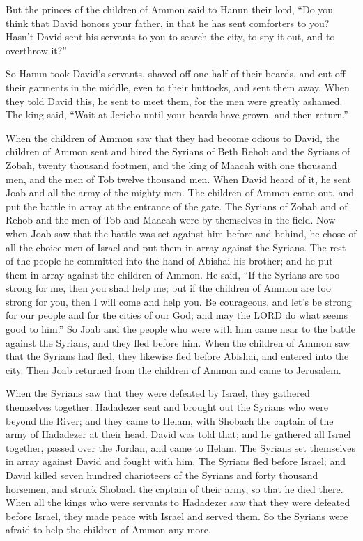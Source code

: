 \myverse{}But the princes of the children of Ammon said to Hanun their lord,
“Do you think that David honors your father, in that he has sent comforters to you? Hasn’t David sent
his servants to you to search the city, to spy it out, and to overthrow it?”

\myverse{}So Hanun took David’s servants, shaved off one half of their beards,
and cut off their garments in the middle, even to their buttocks, and sent them away.
\myverse{}When they told David this, he sent to meet them, for the men were greatly ashamed.
The king said, “Wait at Jericho until your beards have grown, and then return.”

\myverse{}When the children of Ammon saw that they had become odious to
David, the children of Ammon sent and hired the Syrians of Beth Rehob and the Syrians of Zobah, twenty
thousand footmen, and the king of Maacah with one thousand men, and the men of Tob twelve thousand men.
\myverse{}When David heard of it, he sent Joab and all the army of the mighty men.
\myverse{}The children of Ammon came out, and put the battle in array at the entrance
of the gate. The Syrians of Zobah and of Rehob and the men of Tob and Maacah were by themselves in the
field.
\myverse{}Now when Joab saw that the battle was set against him before and behind, he
chose of all the choice men of Israel and put them in array against the Syrians.
\myverse{}The rest of the people he committed into the hand of Abishai his brother;
and he put them in array against the children of Ammon.
\myverse{}He said, “If the Syrians are too strong for me, then you shall help me; but
if the children of Ammon are too strong for you, then I will come and help you.
\myverse{}Be courageous, and let’s be strong for our people and for the cities of our
God; and may the LORD do what seems good to him.”
\myverse{}So Joab and the people who were with him came near to the battle against
the Syrians, and they fled before him.
\myverse{}When the children of Ammon saw that the Syrians had fled, they likewise fled
before Abishai, and entered into the city. Then Joab returned from the children of Ammon and came to Jerusalem.

\myverse{}When the Syrians saw that they were defeated by Israel, they
gathered themselves together.
\myverse{}Hadadezer sent and brought out the Syrians who were beyond the River; and
they came to Helam, with Shobach the captain of the army of Hadadezer at their head.
\myverse{}David was told that; and he gathered all Israel together, passed over the
Jordan, and came to Helam. The Syrians set themselves in array against David and fought with him.
\myverse{}The Syrians fled before Israel; and David killed seven hundred charioteers
of the Syrians and forty thousand horsemen, and struck Shobach the captain of their army, so that he died
there.
\myverse{}When all the kings who were servants to Hadadezer saw that they were defeated
before Israel, they made peace with Israel and served them. So the Syrians were afraid to help the children
of Ammon any more.


